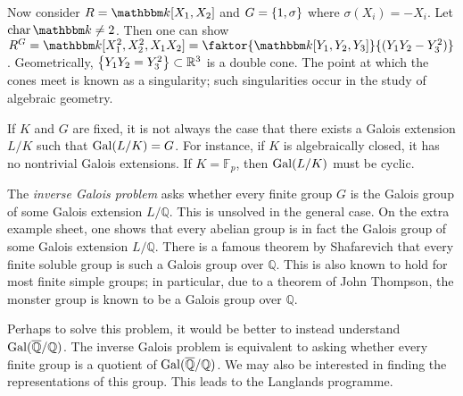 Now consider \( R = \mathbbm k[X_1, X_2] \) and \( G = \qty{1, \sigma} \) where \( \sigma(X_i) = -X_i \).
Let \( \fchar \mathbbm k \neq 2 \).
Then one can show \( R^G = \mathbbm k[X_1^2, X_2^2, X_1 X_2] = \faktor{\mathbbm k[Y_1, Y_2, Y_3]}{(Y_1 Y_2 - Y_3^2)} \).
Geometrically, \( \qty{Y_1 Y_2 = Y_3^2} \subset \mathbb R^3 \) is a double cone.
The point at which the cones meet is known as a singularity; such singularities occur in the study of algebraic geometry.

If \( K \) and \( G \) are fixed, it is not always the case that there exists a Galois extension \( L / K \) such that \( \operatorname{Gal}(L/K) = G \).
For instance, if \( K \) is algebraically closed, it has no nontrivial Galois extensions.
If \( K = \mathbb F_p \), then \( \operatorname{Gal}(L/K) \) must be cyclic.

The \emph{inverse Galois problem} asks whether every finite group \( G \) is the Galois group of some Galois extension \( L / \mathbb Q \).
This is unsolved in the general case.
On the extra example sheet, one shows that every abelian group is in fact the Galois group of some Galois extension \( L / \mathbb Q \).
There is a famous theorem by Shafarevich that every finite soluble group is such a Galois group over \( \mathbb Q \).
This is also known to hold for most finite simple groups; in particular, due to a theorem of John Thompson, the monster group is known to be a Galois group over \( \mathbb Q \).

Perhaps to solve this problem, it would be better to instead understand \( \operatorname{Gal}(\overline{\mathbb Q}/\mathbb Q) \).
The inverse Galois problem is equivalent to asking whether every finite group is a quotient of \( \operatorname{Gal}(\overline{\mathbb Q}/\mathbb Q) \).
We may also be interested in finding the representations of this group.
This leads to the Langlands programme.

